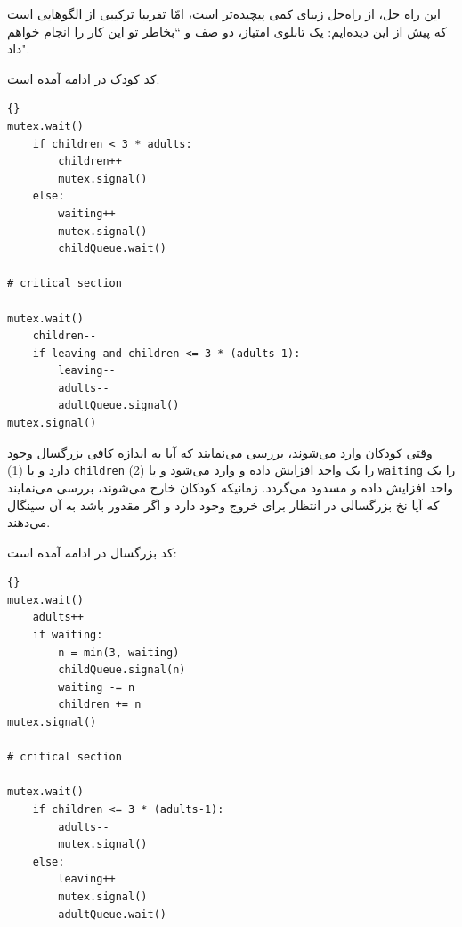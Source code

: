 \documentclass{book}
\begin{document}
    این راه حل، از را‌ه‌حل زیبای  کمی پیچیده‌تر است، امّا تقریبا ترکیبی از الگوهایی است که پیش از این  دیده‌ایم: یک تابلوی امتیاز، دو صف و 
    ‍‍‍‍‍``بخاطر تو این کار را انجام خواهم داد".

    کد کودک در ادامه آمده است. 

\begin{latin}
\begin{lstlisting}[title=\rl{راه‌حل توسعه‌یافته مرکز مراقبت از کودکان (کودک)}]{}
mutex.wait()
    if children < 3 * adults:
        children++
        mutex.signal()
    else:
        waiting++
        mutex.signal()
        childQueue.wait()

# critical section

mutex.wait()
    children--
    if leaving and children <= 3 * (adults-1):
        leaving--
        adults--
        adultQueue.signal() 
mutex.signal()
\end{lstlisting}
\end{latin}

    وقتی کودکان وارد می‌شوند، بررسی می‌نمایند که آیا به اندازه کافی بزرگسال وجود دارد و یا  (1) {\tt children} را یک واحد افزایش داده و وارد می‌شود و 
    یا (2) {\tt waiting}  را یک واحد افزایش داده و مسدود می‌گردد. زمانیکه کودکان خارج می‌شوند، بررسی می‌نمایند که آیا نخ بزرگسالی در انتظار برای خروج 
    وجود دارد و اگر مقدور باشد به آن سینگال می‌دهند. 
    
\newpage
    کد بزرگسال در ادامه آمده است:

\begin{latin}
\begin{lstlisting}[title=\rl{راه‌حل توسعه‌یافته مرکز مراقبت از کودکان (بزرگسال)}]{}
mutex.wait()
    adults++
    if waiting:
        n = min(3, waiting)
        childQueue.signal(n)
        waiting -= n
        children += n
mutex.signal()

# critical section

mutex.wait()
    if children <= 3 * (adults-1):
        adults--
        mutex.signal()
    else:
        leaving++
        mutex.signal()
        adultQueue.wait() 
\end{lstlisting}
\end{latin}
\end{document}
